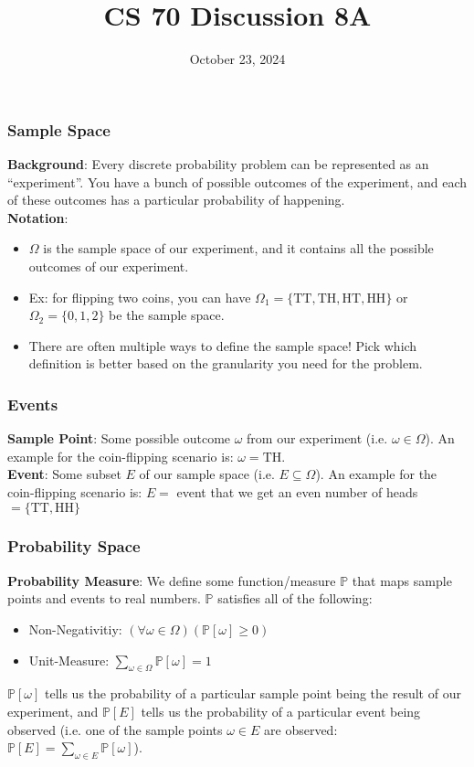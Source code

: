 \documentclass{beamer}
\title{CS 70 Discussion 8A}
\date{October 23, 2024}
\begin{document}
\frame{\titlepage}

\begin{frame}
    \frametitle{Sample Space}
    {\bf Background}: Every discrete probability problem can be represented as an ``experiment''. You have a bunch of possible outcomes of the experiment, and each of these outcomes has a particular probability of happening.\\
    {\bf Notation}:\begin{itemize}
        \item $\Omega$ is the sample space of our experiment, and it contains all the possible outcomes of our experiment.
        \item Ex: for flipping two coins, you can have $\Omega_1=\{\text{TT},\text{TH},\text{HT},\text{HH}\}$ or $\Omega_2=\{0,1,2\}$ be the sample space.
        \item There are often multiple ways to define the sample space! Pick which definition is better based on the granularity you need for the problem.
    \end{itemize}
\end{frame}

\begin{frame}
    \frametitle{Events}
    {\bf Sample Point}: Some possible outcome $\omega$ from our experiment (i.e. $\omega\in\Omega$). An example for the coin-flipping scenario is: $\omega=\text{TH}$.\\
    {\bf Event}: Some subset $E$ of our sample space (i.e. $E\subseteq\Omega$). An example for the  coin-flipping scenario is: $E=$ event that we get an even number of heads $=\{\text{TT},\text{HH}\}$
\end{frame}

\begin{frame}
    \frametitle{Probability Space}
    {\bf Probability Measure}: We define some function/measure $\mathbb{P}$ that maps sample points and events to real numbers. $\mathbb{P}$ satisfies all of the following:
    \begin{itemize}
        \item Non-Negativitiy: $(\forall\omega\in\Omega)(\mathbb{P}[\omega]\geq 0)$
        \item Unit-Measure: $\sum_{\omega\in\Omega}\mathbb{P}[\omega]=1$
    \end{itemize}
    $\mathbb{P}[\omega]$ tells us the probability of a particular sample point being the result of our experiment, and $\mathbb{P}[E]$ tells us the probability of a particular event being observed (i.e. one of the sample points $\omega\in E$ are observed: $\mathbb{P}[E]=\sum_{\omega\in E}\mathbb{P}[\omega]$).
\end{frame}
\end{document}

